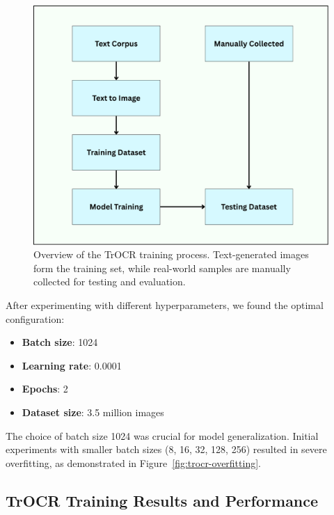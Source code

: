 \begin{figure}[H]
    \centering
    \includegraphics[width=\textwidth]{figures/trocr_model_overflow_training.png}
    \caption{Overview of the TrOCR training process. Text-generated 
    images form the training set, while real-world samples are 
    manually collected for testing and evaluation.}
    \label{fig:trocr-training-pipeline}
\end{figure}

After experimenting with different hyperparameters, we found the optimal configuration:
\begin{itemize}
\item \textbf{Batch size}: 1024
\item \textbf{Learning rate}: 0.0001
\item \textbf{Epochs}: 2
\item \textbf{Dataset size}: 3.5 million images
\end{itemize}

The choice of batch size 1024 was crucial for model generalization. Initial experiments with smaller batch sizes (8, 16, 32, 128, 256) resulted in severe overfitting, as demonstrated in Figure~\ref{fig:trocr-overfitting}.

\subsection{TrOCR Training Results and Performance}
\label{subsec:trocr-training-results}

